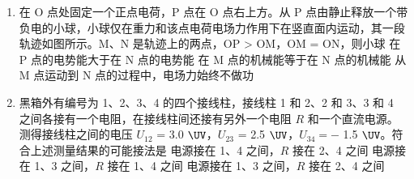 \documentclass[\gkver]{gaokaozhenti}
\begin{document}
\begin{enumerate}
{则粒子做圆周运动有  $qvB = m \frac{v^{2}}{r}$

则有  $\frac{q}{m} = \frac{v}{2a \cdot B}$

如果保持所有条件不变，在磁场区域再加上电场强度大小为 E 的匀强电场，该粒子入射后则会沿 x 轴到达接收屏，则有

 $Eq = qvB$

联立有

 $\frac{q}{m} = \frac{E}{2a \cdot B^{2}}$

故选 A。
}

\item
在 O 点处固定一个正点电荷，P 点在 O 点右上方。从 P 点由静止释放一个带负电的小球，小球仅在重力和该点电荷电场力作用下在竖直面内运动，其一段轨迹如图所示。M、N 是轨迹上的两点，OP > OM，OM = ON，则小球
{在 P 点的电势能大于在 N 点的电势能}
{在 M 点的机械能等于在 N 点的机械能}
{从 M 点运动到 N 点的过程中，电场力始终不做功}

\item
黑箱外有编号为 1、2、3、4 的四个接线柱，接线柱 1 和 2、2 和 3、3 和 4 之间各接有一个电阻，在接线柱间还接有另外一个电阻 $R$ 和一个直流电源。测得接线柱之间的电压 $U_{12}$ = 3.0 $\UV$，$U_{23}$ = 2.5 $\UV$，$U_{34} = -$ 1.5 $\UV$。符合上述测量结果的可能接法是
\onepicture[w=3.97cm]{}
{电源接在 1、4 之间，$R$ 接在 2、4 之间}
{电源接在 1、3 之间，$R$ 接在 1、4 之间}
{电源接在 1、3 之间，$R$ 接在 2、4 之间}
\end{enumerate}
\end{document}
